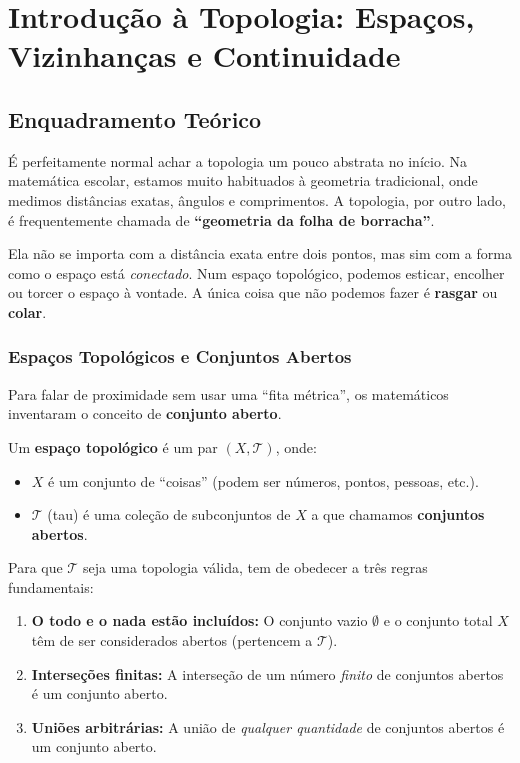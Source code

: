 
\section{Introdução à Topologia: Espaços, Vizinhanças e Continuidade}

\subsection{Enquadramento Teórico}

É perfeitamente normal achar a topologia um pouco abstrata no início. Na matemática escolar, estamos muito habituados à geometria tradicional, onde medimos distâncias exatas, ângulos e comprimentos. A topologia, por outro lado, é frequentemente chamada de \textbf{``geometria da folha de borracha''}.

Ela não se importa com a distância exata entre dois pontos, mas sim com a forma como o espaço está \emph{conectado}. Num espaço topológico, podemos esticar, encolher ou torcer o espaço à vontade. A única coisa que não podemos fazer é \textbf{rasgar} ou \textbf{colar}.

\subsubsection*{Espaços Topológicos e Conjuntos Abertos}

Para falar de proximidade sem usar uma ``fita métrica'', os matemáticos inventaram o conceito de \textbf{conjunto aberto}.

\begin{defbox}[title={Espaço Topológico}]
  Um \textbf{espaço topológico} é um par $(X, \mathcal{T})$, onde:
  \begin{itemize}
    \item $X$ é um conjunto de ``coisas'' (podem ser números, pontos, pessoas, etc.).
    \item $\mathcal{T}$ (tau) é uma coleção de subconjuntos de $X$ a que chamamos \textbf{conjuntos abertos}.
  \end{itemize}
\end{defbox}

Para que $\mathcal{T}$ seja uma topologia válida, tem de obedecer a três regras fundamentais:
\begin{enumerate}
  \item \textbf{O todo e o nada estão incluídos:} O conjunto vazio $\emptyset$ e o conjunto total $X$ têm de ser considerados abertos (pertencem a $\mathcal{T}$).
  \item \textbf{Interseções finitas:} A interseção de um número \emph{finito} de conjuntos abertos é um conjunto aberto.
  \item \textbf{Uniões arbitrárias:} A união de \emph{qualquer quantidade} de conjuntos abertos é um conjunto aberto.
\end{enumerate}

